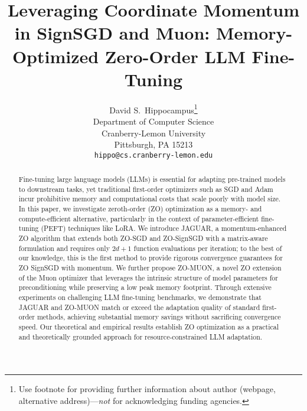 \documentclass{article}
\title{Leveraging Coordinate Momentum in SignSGD and Muon: Memory-Optimized Zero-Order
LLM Fine-Tuning}
\author{%
  David S.~Hippocampus\thanks{Use footnote for providing further information
    about author (webpage, alternative address)---\emph{not} for acknowledging
    funding agencies.} \\
  Department of Computer Science\\
  Cranberry-Lemon University\\
  Pittsburgh, PA 15213 \\
  \texttt{hippo@cs.cranberry-lemon.edu} \\
}
\theoremstyle{plain}
\theoremstyle{definition}
\theoremstyle{remark}
\begin{document}
\maketitle


\begin{abstract}

  Fine-tuning large language models (LLMs) is essential for adapting pre-trained models to downstream tasks, yet traditional first-order optimizers such as SGD and Adam incur prohibitive memory and computational costs that scale poorly with model size. In this paper, we investigate zeroth-order (ZO) optimization as a memory- and compute-efficient alternative, particularly in the context of parameter-efficient fine-tuning (PEFT) techniques like LoRA. We introduce JAGUAR, a momentum-enhanced ZO algorithm that extends both ZO-SGD and ZO-SignSGD with a matrix-aware formulation and requires only $2d+1$ function evaluations per iteration; to the best of our knowledge, this is the first method to provide rigorous convergence guarantees for ZO SignSGD with momentum. We further propose ZO-MUON, a novel ZO extension of the Muon optimizer that leverages the intrinsic structure of model parameters for preconditioning while preserving a low peak memory footprint. Through extensive experiments on challenging LLM fine-tuning benchmarks, we demonstrate that JAGUAR and ZO-MUON match or exceed the adaptation quality of standard first-order methods, achieving substantial memory savings without sacrificing convergence speed. Our theoretical and empirical results establish ZO optimization as a practical and theoretically grounded approach for resource-constrained LLM adaptation.

\end{abstract}
\end{document}
